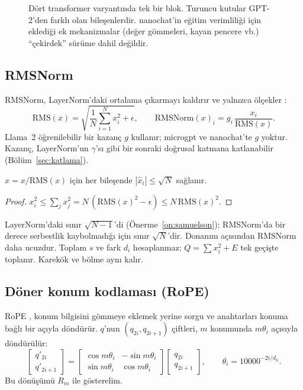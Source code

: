\begin{figure}[h]
  \centering
  \caption[Transformer varyantları]{Dört transformer varyantında tek bir blok. Turuncu kutular GPT-2'den farklı olan bileşenlerdir. nanochat'in eğitim verimliliği için eklediği ek mekanizmalar (değer gömmeleri, kayan pencere vb.) ``çekirdek'' sürüme dahil değildir.}
  \label{fig:varyant}
\end{figure}

\subsection{RMSNorm}
RMSNorm, LayerNorm'daki ortalama çıkarmayı kaldırır ve yalnızca ölçekler \cite{rmsnorm}:
\begin{equation}
  \mathrm{RMS}(x) = \sqrt{\frac{1}{N}\sum_{i=1}^{N} x_i^2 + \epsilon}, \qquad \mathrm{RMSNorm}(x)_i = g_i\, \frac{x_i}{\mathrm{RMS}(x)} .
\end{equation}
Llama~2 öğrenilebilir bir kazanç $g$ kullanır; microgpt ve nanochat'te $g$ yoktur. Kazanç, LayerNorm'un $\gamma$'sı gibi bir sonraki doğrusal katmana katlanabilir (Bölüm~\ref{sec:katlama}).

\begin{onerme}\label{on:rms}
$\hat x = x/\mathrm{RMS}(x)$ için her bileşende $|\hat x_i| \le \sqrt N$ sağlanır.
\end{onerme}
\begin{proof}
$x_i^2 \le \sum_j x_j^2 = N\,(\mathrm{RMS}(x)^2 - \epsilon) \le N\,\mathrm{RMS}(x)^2$.
\end{proof}

\noindent LayerNorm'daki sınır $\sqrt{N-1}$'di (Önerme~\ref{on:samuelson}); RMSNorm'da bir derece serbestlik kaybolmadığı için sınır $\sqrt N$'dir. Donanım açısından RMSNorm daha ucuzdur. Toplam $s$ ve fark $d_i$ hesaplanmaz; $Q = \sum x_i^2 + E$ tek geçişte toplanır. Karekök ve bölme aynı kalır.

\subsection{Döner konum kodlaması (RoPE)}
RoPE \cite{rope}, konum bilgisini gömmeye eklemek yerine sorgu ve anahtarları konuma bağlı bir açıyla döndürür. $q$'nun $(q_{2i}, q_{2i+1})$ çiftleri, $m$ konumunda $m\theta_i$ açısıyla döndürülür:
\begin{equation}
  \begin{bmatrix} q'_{2i} \\ q'_{2i+1} \end{bmatrix} =
  \begin{bmatrix} \cos m\theta_i & -\sin m\theta_i \\ \sin m\theta_i & \cos m\theta_i \end{bmatrix}
  \begin{bmatrix} q_{2i} \\ q_{2i+1} \end{bmatrix}, \qquad \theta_i = 10000^{-2i/d_h}.
\end{equation}
Bu dönüşümü $R_m$ ile gösterelim.

